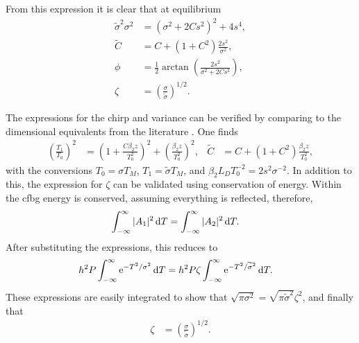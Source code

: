 From this expression it is clear that at equilibrium
\begin{subequations}
\begin{align}
\label{eq:varout}
\widetilde{\sigma}^2 \sigma^2 &= \left( \sigma^2 + 2 C s^2 \right)^2 + 4s^4, \\
\label{eq:chirpout}
\widetilde{C} &= C + (1+C^2) \frac{2 s^2}{\sigma^2}, \\
\label{eq:phase}
\phi &= \frac{1}{2} \arctan \left( \frac{2s^2}{\sigma^2 + 2C s^2} \right), \\
\zeta &= \left( \frac{\sigma}{\widetilde{\sigma}} \right)^{1/2}.
\end{align}
\end{subequations}

The expressions for the chirp and variance can be verified by comparing to the dimensional equivalents from the literature \cite{agrawal2013, anderson, ferreira, silfvast}. One finds
\begin{align*}
\left( \frac{T_1}{T_0} \right)^2 &= \left( 1 + \frac{C \beta_2 z}{T_0^2} \right)^2 + \left( \frac{ \beta_2 z}{T_0^2} \right)^2,&
\widetilde{C} &= C + (1+C^2) \frac{\beta_2 z}{T_0^2},
\end{align*}
with the conversions $T_0 = \sigma T_M$, $T_1 = \widetilde{\sigma} T_M$, and $\beta_2 L_D T_0^{-2} = 2s^2\sigma^{-2}$. In addition to this, the expression for $\zeta$ can be validated using conservation of energy. Within the \gls{cfbg} energy is conserved, assuming everything is reflected, therefore,
\begin{align*}
\int_{-\infty}^\infty |A_1|^2 \, \textrm{d} T &= \int_{-\infty}^\infty |A_2|^2 \, \textrm{d} T.
\end{align*}
After substituting the expressions, this reduces to
\begin{align*}
h^2 P \int_{-\infty}^\infty \textrm{e}^{-T^2/\sigma^2} \, \textrm{d} T &= h^2 P \zeta \int_{-\infty}^\infty \textrm{e}^{-T^2/\widetilde{\sigma}^2} \, \textrm{d} T.
\end{align*}
These expressions are easily integrated to show that $\sqrt{\pi \sigma^2} = \sqrt{\pi \widetilde{\sigma}^2} \zeta^2$, and finally that
\begin{align*}
\zeta &= \left( \frac{\sigma}{\widetilde{\sigma}} \right)^{1/2}.
\end{align*}






